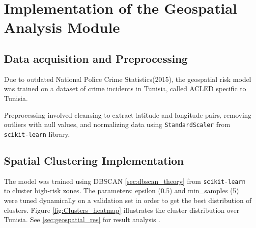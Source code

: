 \documentclass[12pt,a4paper,oneside,english]{book}
\begin{document}
{%


\section{Implementation of the Geospatial Analysis Module}
\label{geospatial_implementation}
\subsection{Data acquisition and Preprocessing}
Due to outdated National Police Crime Statistics(2015), the geospatial risk model was trained on a dataset of crime incidents in Tunisia, called ACLED \cite{raleigh2010acled} specific to Tunisia.

Preprocessing involved cleansing to extract latitude and longitude pairs, removing outliers with null values, and normalizing data using \texttt{StandardScaler} from \texttt{scikit-learn} library.
\subsection{Spatial Clustering Implementation}
The model was trained using DBSCAN \ref{sec:dbscan_theory} from \texttt{scikit-learn} to cluster high-risk zones. 
The parameters: epsilon (0.5) and min\_samples (5) were tuned dynamically on a validation set in order to get the best distribution of clusters.
Figure \ref{fig:Clusters_heatmap} illustrates the cluster distribution over Tunisia. See \ref{sec:geospatial_res} for result analysis .


}
\end{document}
